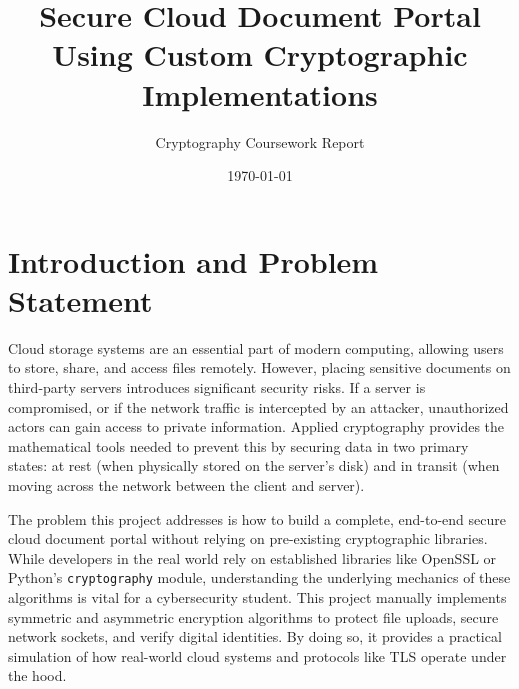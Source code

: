 \documentclass[12pt,a4paper]{article}
\begin{document}
\title{\textbf{Secure Cloud Document Portal Using Custom Cryptographic Implementations}}
\author{Cryptography Coursework Report}
\date{\today}
\maketitle

\section{Introduction and Problem Statement}
Cloud storage systems are an essential part of modern computing, allowing users to store, share, and access files remotely. However, placing sensitive documents on third-party servers introduces significant security risks. If a server is compromised, or if the network traffic is intercepted by an attacker, unauthorized actors can gain access to private information. Applied cryptography provides the mathematical tools needed to prevent this by securing data in two primary states: at rest (when physically stored on the server's disk) and in transit (when moving across the network between the client and server).

The problem this project addresses is how to build a complete, end-to-end secure cloud document portal without relying on pre-existing cryptographic libraries. While developers in the real world rely on established libraries like OpenSSL or Python's \texttt{cryptography} module, understanding the underlying mechanics of these algorithms is vital for a cybersecurity student. This project manually implements symmetric and asymmetric encryption algorithms to protect file uploads, secure network sockets, and verify digital identities. By doing so, it provides a practical simulation of how real-world cloud systems and protocols like TLS operate under the hood.
\end{document}
